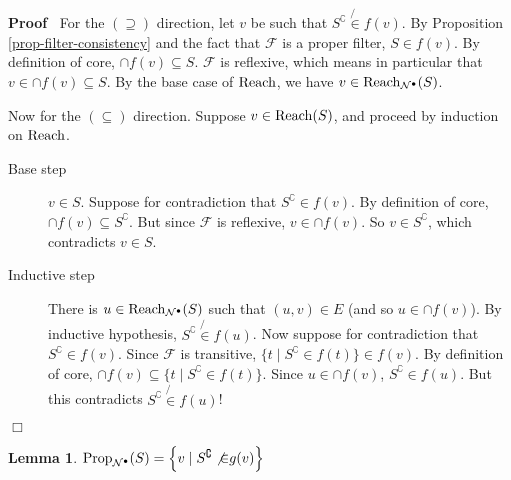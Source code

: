 \documentclass{article}
\newcommand{\tmop}[1]{\ensuremath{\operatorname{#1}}}
\newenvironment{proof}{\noindent\textbf{Proof\ }}{\hspace*{\fill}$\Box$\medskip}
\newtheorem{lemma}{Lemma}
\newcommand{\Net}{\ensuremath{\mathcal{N}}}
\newcommand{\Reach}{\textsf{\tmop{Reach}}}
\newcommand{\Prop}{\textsf{\tmop{Prop}}}
\begin{document}
\begin{proof}
  For the $(\supseteq)$ direction, let $v$ be such that $S^{\complement}
  \not{\in} f (v)$. By Proposition \ref{prop-filter-consistency} and the fact
  that $\mathcal{F}$ is a proper filter, $S \in f (v)$. By definition of core,
  $\cap f (v) \subseteq S$. $\mathcal{F}$ is reflexive, which means in
  particular that $v \in \cap f (v) \subseteq S$. By the base case of
  $\Reach$, we have $v \in \Reach_{\Net^{\bullet}} (S)$.
  
  Now for the $(\subseteq)$ direction. Suppose $v \in \Reach (S)$, and proceed
  by induction on $\Reach$.
  \begin{description}
    \item[Base step] $v \in S$. Suppose for contradiction that
    $S^{\complement} \in f (v)$. By definition of core, $\cap f (v) \subseteq
    S^{\complement}$. But since $\mathcal{F}$ is reflexive, $v \in \cap f
    (v)$. So $v \in S^{\complement}$, which contradicts $v \in S$.
    
    \item[Inductive step] There is $u \in \Reach_{\Net^{\bullet}} (S)$ such
    that $(u, v) \in E$ (and so $u \in \cap f (v)$). By inductive hypothesis,
    $S^{\complement} \not{\in} f (u)$. Now suppose for contradiction that
    $S^{\complement} \in f (v)$. Since $\mathcal{F}$ is transitive, $\{ t \mid
    S^{\complement} \in f (t) \} \in f (v)$. By definition of core, $\cap f
    (v) \subseteq \{ t \mid S^{\complement} \in f (t) \}$. Since $u \in \cap f
    (v)$, $S^{\complement} \in f (u)$. But this contradicts $S^{\complement}
    \not{\in} f (u)$!
  \end{description}
\end{proof}

\begin{lemma}
  \label{lemma-Prop-and-H*}$\Prop_{\Net^{\bullet}} (S) = \left\{ v \mid
  S^{\complement}  \not{\in} g (v) \right\}$
\end{lemma}
\end{document}
